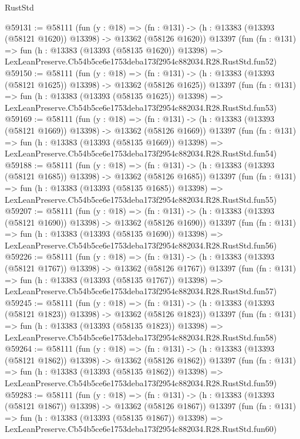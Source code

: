 \begin{lexlean}{RustStd}
\begin{coremodule}
@59131 := @58111
    (fun (y : @18) =>
    (fn : @131) -> (h : @13383 (@13393 (@58121 @1620)) @13398) -> @13362 (@58126 @1620))
    @13397
    (fun (fn : @131) =>
    fun (h : @13383 (@13393 (@58135 @1620)) @13398) =>
    LexLeanPreserve.Cb54b5ce6e1753deba173f2954c882034.R28.RustStd.fun52)
@59150 := @58111
    (fun (y : @18) =>
    (fn : @131) -> (h : @13383 (@13393 (@58121 @1625)) @13398) -> @13362 (@58126 @1625))
    @13397
    (fun (fn : @131) =>
    fun (h : @13383 (@13393 (@58135 @1625)) @13398) =>
    LexLeanPreserve.Cb54b5ce6e1753deba173f2954c882034.R28.RustStd.fun53)
@59169 := @58111
    (fun (y : @18) =>
    (fn : @131) -> (h : @13383 (@13393 (@58121 @1669)) @13398) -> @13362 (@58126 @1669))
    @13397
    (fun (fn : @131) =>
    fun (h : @13383 (@13393 (@58135 @1669)) @13398) =>
    LexLeanPreserve.Cb54b5ce6e1753deba173f2954c882034.R28.RustStd.fun54)
@59188 := @58111
    (fun (y : @18) =>
    (fn : @131) -> (h : @13383 (@13393 (@58121 @1685)) @13398) -> @13362 (@58126 @1685))
    @13397
    (fun (fn : @131) =>
    fun (h : @13383 (@13393 (@58135 @1685)) @13398) =>
    LexLeanPreserve.Cb54b5ce6e1753deba173f2954c882034.R28.RustStd.fun55)
@59207 := @58111
    (fun (y : @18) =>
    (fn : @131) -> (h : @13383 (@13393 (@58121 @1690)) @13398) -> @13362 (@58126 @1690))
    @13397
    (fun (fn : @131) =>
    fun (h : @13383 (@13393 (@58135 @1690)) @13398) =>
    LexLeanPreserve.Cb54b5ce6e1753deba173f2954c882034.R28.RustStd.fun56)
@59226 := @58111
    (fun (y : @18) =>
    (fn : @131) -> (h : @13383 (@13393 (@58121 @1767)) @13398) -> @13362 (@58126 @1767))
    @13397
    (fun (fn : @131) =>
    fun (h : @13383 (@13393 (@58135 @1767)) @13398) =>
    LexLeanPreserve.Cb54b5ce6e1753deba173f2954c882034.R28.RustStd.fun57)
@59245 := @58111
    (fun (y : @18) =>
    (fn : @131) -> (h : @13383 (@13393 (@58121 @1823)) @13398) -> @13362 (@58126 @1823))
    @13397
    (fun (fn : @131) =>
    fun (h : @13383 (@13393 (@58135 @1823)) @13398) =>
    LexLeanPreserve.Cb54b5ce6e1753deba173f2954c882034.R28.RustStd.fun58)
@59264 := @58111
    (fun (y : @18) =>
    (fn : @131) -> (h : @13383 (@13393 (@58121 @1862)) @13398) -> @13362 (@58126 @1862))
    @13397
    (fun (fn : @131) =>
    fun (h : @13383 (@13393 (@58135 @1862)) @13398) =>
    LexLeanPreserve.Cb54b5ce6e1753deba173f2954c882034.R28.RustStd.fun59)
@59283 := @58111
    (fun (y : @18) =>
    (fn : @131) -> (h : @13383 (@13393 (@58121 @1867)) @13398) -> @13362 (@58126 @1867))
    @13397
    (fun (fn : @131) =>
    fun (h : @13383 (@13393 (@58135 @1867)) @13398) =>
    LexLeanPreserve.Cb54b5ce6e1753deba173f2954c882034.R28.RustStd.fun60)

\end{coremodule}
\end{lexlean}
